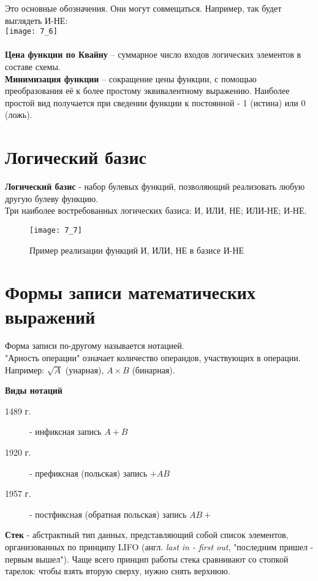 Это основные обозначения. Они могут совмещаться. Например, так будет выглядеть И-НЕ:
\\\texttt{[image: 7\_6]}
\\
\\\textbf{Цена функции по Квайну} – суммарное число входов логических элементов в составе схемы.
\\\textbf{Минимизация функции} – сокращение цены функции, с помощью преобразования её к более простому эквивалентному выражению.
Наиболее простой вид получается при сведении функции к постоянной - 1 (истина) или 0 (ложь).
\section{Логический базис}
\textbf{Логический базис} - набор булевых функций, позволяющий реализовать любую другую булеву функцию.
\\Три наиболее востребованных логических базиса: И, ИЛИ, НЕ; ИЛИ-НЕ; И-НЕ.
\begin{figure}[!h]
\centering
\caption{Пример реализации функций И, ИЛИ, НЕ в базисе И-НЕ}
\texttt{[image: 7\_7]}
\end{figure}
\section{Формы записи математических выражений}
Форма записи по-другому называется нотацией.
\\"Арность операции" означает количество операндов, участвующих в операции.
\\Например: $\sqrt{A}$ (унарная), $A\times B$ (бинарная).
\\
\begin{center}
 \textbf{Виды нотаций}
\end{center}
\begin{description}
  \item[1489 г.] - инфиксная запись $A + B$
  \item[1920 г.] - префиксная (польская) запись $+AB$
  \item[1957 г.] - постфиксная (обратная польская) запись $AB+$
\end{description}
\textbf{Стек} - абстрактный тип данных, представляющий собой список элементов, организованных по принципу LIFO (англ. \emph{last in - first out}, "последним пришел - первым вышел"). Чаще всего принцип работы стека сравнивают со стопкой тарелок: чтобы взять вторую сверху, нужно снять верхнюю.
